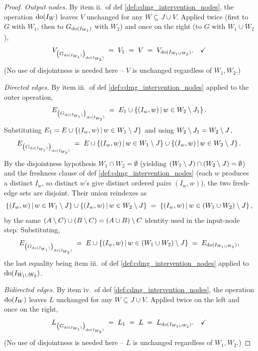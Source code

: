 \documentclass[main]{subfiles}
\begin{document}
\begin{proof}
\medskip\noindent\emph{Output nodes.}
By item ii.\ of def \ref{def:cdmg_intervention_nodes}, the operation $\operatorname{do}(I_W)$ leaves $V$ unchanged for any $W \subseteq J \cup V$. Applied twice (first to $G$ with $W_1$, then to $G_{\operatorname{do}(I_{W_1})}$ with $W_2$) and once on the right (to $G$ with $W_1 \cup W_2$),
\[
    V_{\left ( G_{\operatorname{do}(I_{W_1})} \right )_{\operatorname{do}(I_{W_2})}} \;=\; V_1 \;=\; V \;=\; V_{\operatorname{do}(I_{W_1 \cup W_2})}. \quad \checkmark
\]
(No use of disjointness is needed here -- $V$ is unchanged regardless of $W_1, W_2$.)

\medskip\noindent\emph{Directed edges.}
By item iii.\ of def \ref{def:cdmg_intervention_nodes} applied to the outer operation,
\[
    E_{\left ( G_{\operatorname{do}(I_{W_1})} \right )_{\operatorname{do}(I_{W_2})}} \;=\; E_1 \cup \left \{ (I_w, w) \,\middle|\, w \in W_2 \setminus J_1 \right \}.
\]
Substituting $E_1 = E \cup \left \{ (I_w, w) \,\middle|\, w \in W_1 \setminus J \right \}$ and using $W_2 \setminus J_1 = W_2 \setminus J$,
\[
    E_{\left ( G_{\operatorname{do}(I_{W_1})} \right )_{\operatorname{do}(I_{W_2})}} \;=\; E \cup \left \{ (I_w, w) \,\middle|\, w \in W_1 \setminus J \right \} \cup \left \{ (I_w, w) \,\middle|\, w \in W_2 \setminus J \right \}.
\]
By the disjointness hypothesis $W_1 \cap W_2 = \emptyset$ (yielding $(W_1 \setminus J) \cap (W_2 \setminus J) = \emptyset$) and the freshness clause of def \ref{def:cdmg_intervention_nodes} (each $w$ produces a distinct $I_w$, so distinct $w$'s give distinct ordered pairs $(I_w, w)$), the two fresh-edge sets are disjoint. Their union reindexes as
\[
    \left \{ (I_w, w) \,\middle|\, w \in W_1 \setminus J \right \} \cup \left \{ (I_w, w) \,\middle|\, w \in W_2 \setminus J \right \} \;=\; \left \{ (I_w, w) \,\middle|\, w \in (W_1 \cup W_2) \setminus J \right \},
\]
by the same $(A \setminus C) \cup (B \setminus C) = (A \cup B) \setminus C$ identity used in the input-node step. Substituting,
\[
    E_{\left ( G_{\operatorname{do}(I_{W_1})} \right )_{\operatorname{do}(I_{W_2})}} \;=\; E \cup \left \{ (I_w, w) \,\middle|\, w \in (W_1 \cup W_2) \setminus J \right \} \;=\; E_{\operatorname{do}(I_{W_1 \cup W_2})},
\]
the last equality being item iii.\ of def \ref{def:cdmg_intervention_nodes} applied to $\operatorname{do}(I_{W_1 \cup W_2})$. \checkmark

\medskip\noindent\emph{Bidirected edges.}
By item iv.\ of def \ref{def:cdmg_intervention_nodes}, the operation $\operatorname{do}(I_W)$ leaves $L$ unchanged for any $W \subseteq J \cup V$. Applied twice on the left and once on the right,
\[
    L_{\left ( G_{\operatorname{do}(I_{W_1})} \right )_{\operatorname{do}(I_{W_2})}} \;=\; L_1 \;=\; L \;=\; L_{\operatorname{do}(I_{W_1 \cup W_2})}. \quad \checkmark
\]
(No use of disjointness is needed here -- $L$ is unchanged regardless of $W_1, W_2$.)


\end{proof}
\end{document}
